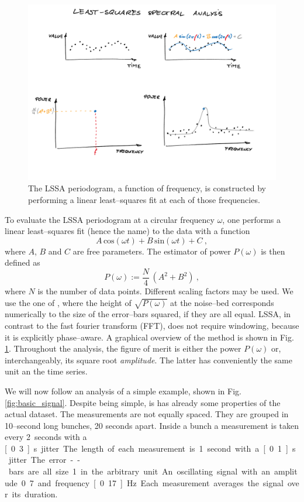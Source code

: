 \begin{figure}
  \centering \includegraphics[width=\linewidth]{gfx/axions/LSSA}
  \caption{The LSSA periodogram, a function of frequency, is constructed by performing a linear least--squares fit at each of those frequencies.}
  \label{fig:LSSA_overview}
\end{figure}

To evaluate the LSSA periodogram at a circular frequency $\omega$, one performs a linear least--squares fit (hence the name) to the data with a function
\begin{equation}
  A\,\mathrm{cos}(\omega t) + B\,\mathrm{sin}(\omega t) + C \ ,
\end{equation}
where $A$, $B$ and $C$ are free parameters. The estimator of power $P(\omega)$ is then defined as
\begin{equation}
  P(\omega) := \frac{N}{4} \, \left( A^2 + B^2 \right) \ ,
\end{equation}
where $N$ is the number of data points. Different scaling factors may be used. We use the one of \cite{Scargle1982}, where the height of $\sqrt{P(\omega)}$ at the noise--bed corresponds numerically to the size of the error--bars squared, if they are all equal. LSSA, in contrast to the fast fourier transform (FFT), does not require windowing, because it is explicitly phase--aware. A graphical overview of the method is shown in Fig.\,\ref{fig:LSSA_overview}. Throughout the analysis, the figure of merit is either the power $P(\omega)$ or, interchangeably, its square root \emph{amplitude}. The latter has conveniently the same unit an the time series.

We will now follow an analysis of a simple example, shown in Fig.\,\ref{fig:basic_signal}. Despite being simple, is has already some properties of the actual dataset. The measurements are not equally spaced. They are grouped in 10--second long bunches, 20 seconds apart. Inside a bunch a measurement is taken every 2~seconds with a \unit[0.3]{s} jitter. The length of each measurement is 1~second with a \unit[0.1]{s} jitter. The error--bars are all size 1 in the arbitrary unit. An oscillating signal with an amplitude 0.7 and frequency \unit[0.17]{Hz}. Each measurement averages the signal over its duration.

